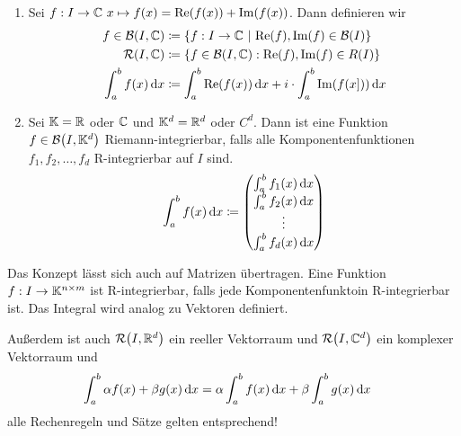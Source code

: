 \noindent
\begin{definition}
    \begin{enumerate}[label=(\alph*)]
        \theoremescape
        \item Sei $f: I\fromto\C~x\mapsto f\of{x} = \Re\of{f\of{x}} + \Im\of{f\of{x}}$. Dann definieren wir
        \begin{align*}
            f\in\mB\of{I, \C} &\coloneqq\set{f: I\fromto\C~\middle|~\Re\of{f}, \Im\of{f} \in \mB\of{I}}\\
            \mR\of{I, \C} &\coloneqq\set{f\in\mB\of{I, \C}: \Re\of{f}, \Im\of{f}\in R\of{I}}\\
            \int_{a}^{b} f\of{x} \dif x &\coloneqq \int_{a}^{b} \Re\of{f\of{x}} \dif x + i\cdot \int_{a}^{b} \Im\of{f\of{x]}} \dif x
        \end{align*}
        \item Sei $\mathbb{K}= \mathbb{R}$ oder $\mathbb{C}$ und $\mathbb{K}^d = \mathbb{R}^d$ oder $C^d$. Dann ist eine Funktion $f\in\mB\of{I, \K^d}$ Riemann-integrierbar, falls alle Komponentenfunktionen $f_1, f_2, \dots, f_d$ R-integrierbar auf $I$ sind.
        \begin{align*}
            \int_{a}^{b} f\of{x} \dif x\coloneqq \begin{pmatrix}
                                                     \int_{a}^{b} f_1\of{x} \dif x \\
                                                     \int_{a}^{b} f_2\of{x} \dif x \\
                                                     \vdots                        \\
                                                     \int_{a}^{b} f_d\of{x} \dif x \\
            \end{pmatrix}
        \end{align*}
    \end{enumerate}
\end{definition}

\begin{bemerkung}
    Das Konzept lässt sich auch auf Matrizen übertragen. Eine Funktion $f: I\rightarrow{} \mathbb{K}^{n\times m}$ ist R-integrierbar, falls jede Komponentenfunktoin R-integrierbar ist. Das Integral wird analog zu Vektoren definiert.
\end{bemerkung}

\begin{bemerkung}
    Außerdem ist auch $\mR\of{I, \R^d}$ ein reeller Vektorraum und $\mR\of{I, \C^d}$ ein komplexer Vektorraum und
    \begin{align*}
        \int_{a}^{b} \alpha f\of{x} + \beta g\of{x} \dif x &= \alpha \int_{a}^{b} f\of{x} \dif x + \beta \int_{a}^{b} g\of{x} \dif x
    \end{align*}
    alle Rechenregeln und Sätze gelten entsprechend!
\end{bemerkung}

\newpage
